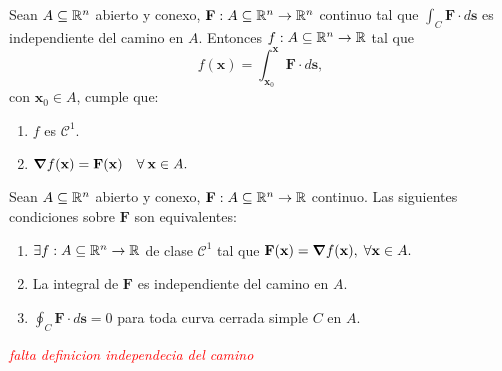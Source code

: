 \begin{theorem}
    Sean $A\subseteq\mathbb{R}^n$ abierto y conexo, $\mathbf{F}:A\subseteq\mathbb{R}^n\to\mathbb{R}^n$ continuo tal que $\int_C \mathbf{F}\cdot d\mathbf{s}$ es independiente del camino en $A$. Entonces $f:A\subseteq\mathbb{R}^n\to\mathbb{R}$ tal que
    $$f(\mathbf{x})=\int_{\mathbf{x}_0}^{\mathbf{x}}\mathbf{F}\cdot d\mathbf{s},$$
    con $\mathbf{x}_0\in A$, cumple que: 
    \begin{enumerate}
        \item $f$ es $\mathcal{C}^1$.
        \item $\grad f(\mathbf{x})=\mathbf{F}(\mathbf{x})\quad\forall\:\mathbf{x}\in A.$
    \end{enumerate}
\end{theorem}

\begin{theorem}
    Sean $A\subseteq\mathbb{R}^n$ abierto y conexo, $\mathbf{F}:A\subseteq\mathbb{R}^n\to\mathbb{R}$ continuo. Las siguientes condiciones sobre $\mathbf{F}$ son equivalentes:
    \begin{enumerate}
        \item $\exists f:A\subseteq\mathbb{R}^n\to\mathbb{R}$ de clase $\mathcal{C}^1$ tal que $\mathbf{F}(\mathbf{x})=\grad f(\mathbf{x}),\;\forall\mathbf{x}\in A.$ 
        \item La integral de $\mathbf{F}$ es independiente del camino en $A$.
        \item $\oint_C\mathbf{F}\cdot d\mathbf{s}=0$ para toda curva cerrada simple $C$ en $A$.
    \end{enumerate}
\end{theorem}

\textcolor{red}{\textit{falta definicion independecia del camino}}